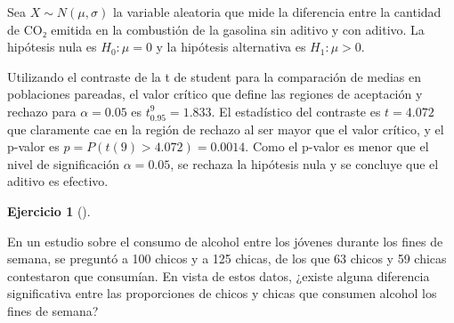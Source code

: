 \documentclass[
  spanish,
  a4paper,
]{scrreport}
\theoremstyle{definition}
\newtheorem{exercise}{Ejercicio}[chapter]
\theoremstyle{remark}
\begin{document}
\begin{tcolorbox}[enhanced jigsaw, arc=.35mm, bottomrule=.15mm, bottomtitle=1mm, breakable, colback=white, colbacktitle=quarto-callout-tip-color!10!white, colframe=quarto-callout-tip-color-frame, coltitle=black, left=2mm, leftrule=.75mm, opacityback=0, opacitybacktitle=0.6, rightrule=.15mm, title=\textcolor{quarto-callout-tip-color}{\faLightbulb}\hspace{0.5em}{Solución}, titlerule=0mm, toprule=.15mm, toptitle=1mm]

Sea \(X\sim N(\mu,\sigma)\) la variable aleatoria que mide la diferencia
entre la cantidad de CO₂ emitida en la combustión de la gasolina sin
aditivo y con aditivo. La hipótesis nula es \(H_0: \mu = 0\) y la
hipótesis alternativa es \(H_1: \mu>0\).

Utilizando el contraste de la t de student para la comparación de medias
en poblaciones pareadas, el valor crítico que define las regiones de
aceptación y rechazo para \(\alpha=0.05\) es \(t^9_{0.95}=1.833\). El
estadístico del contraste es \(t=4.072\) que claramente cae en la región
de rechazo al ser mayor que el valor crítico, y el p-valor es
\(p = P(t(9)>4.072) = 0.0014\). Como el p-valor es menor que el nivel de
significación \(\alpha = 0.05\), se rechaza la hipótesis nula y se
concluye que el aditivo es efectivo.

\end{tcolorbox}

\begin{exercise}[]\protect\hypertarget{exr-contraste-proporcion-consumo-alcohol}{}\label{exr-contraste-proporcion-consumo-alcohol}

En un estudio sobre el consumo de alcohol entre los jóvenes durante los
fines de semana, se preguntó a 100 chicos y a 125 chicas, de los que 63
chicos y 59 chicas contestaron que consumían. En vista de estos datos,
¿existe alguna diferencia significativa entre las proporciones de chicos
y chicas que consumen alcohol los fines de semana?

\end{exercise}
\end{document}
